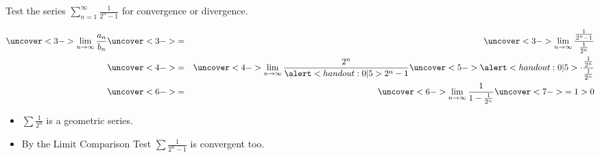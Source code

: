 \begin{frame}
\begin{example}[Example 3, p. 743]
Test the series $\sum_{n=1}^\infty \frac{1}{2^n-1}$ for convergence or divergence.

%
\abovedisplayskip=0pt
\belowdisplayskip=0pt
\begin{eqnarray*}
\uncover<3->{%
\lim_{n\to\infty} \frac{a_n}{b_n}%
}%
& \uncover<3->{ = } &%
\uncover<3->{%
\lim_{n\to\infty} \frac{\frac{1}{2^n-1}}{\frac{1}{2^n}}%
}\\%
& \uncover<4->{ = } &%
\uncover<4->{%
\lim_{n\to\infty} \frac{2^n}{\alert<handout:0| 5>{2^n}-1}\uncover<5->{\alert<handout:0| 5>{\cdot \frac{\frac{1}{2^n}}{\frac{1}{2^n}}}}%
}\\%
& \uncover<6->{ = } &%
\uncover<6->{%
\lim_{n\to\infty} \frac{1}{1-\frac{1}{2^n}}%
}%
\uncover<7->{%
 = 1 > 0%
}%
\end{eqnarray*}
\begin{itemize}
\item<8-| alert@8-9>  $\sum \frac{1}{2^n}$ is a  geometric series.
\item<10->  By the Limit Comparison Test $\sum \frac{1}{2^n-1}$ is convergent too.%
\end{itemize}
\end{example}
\end{frame}
